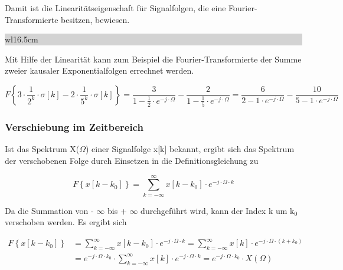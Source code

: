 \noindent Damit ist die Linearit\"{a}tseigenschaft f\"{u}r Signalfolgen, die eine Fourier-Transformierte besitzen, bewiesen.\bigskip

\noindent
\colorbox{lightgray}{%
%
\renewcommand\arraystretch{0.6}%
\begin{tabular}{ wl{16.5cm} }
{}
\end{tabular}%
}\medskip

\noindent Mit Hilfe der Linearit\"{a}t kann zum Beispiel die Fourier-Transformierte der Summe zweier kausaler Exponentialfolgen errechnet werden. 

\begin{equation}\label{eq:sevenfiftyfour}
F\left\{3\cdot \frac{1}{2^{k} } \cdot \sigma \left[k\right]-2\cdot \frac{1}{5^{k} } \cdot \sigma \left[k\right]\right\}=\frac{3}{1-\frac{1}{2} \cdot e^{-j\cdot \Omega } } -\frac{2}{1-\frac{1}{5} \cdot e^{-j\cdot \Omega } } =\frac{6}{2-1\cdot e^{-j\cdot \Omega } } -\frac{10}{5-1\cdot e^{-j\cdot \Omega }}
\end{equation}

\subsubsection{Verschiebung im Zeitbereich}

\noindent Ist das Spektrum X($\Omega$) einer Signalfolge x[k] bekannt, ergibt sich das Spektrum der verschobenen Folge durch Einsetzen in die Definitionsgleichung zu

\begin{equation}\label{eq:sevenfiftyfive}
F\left\{x\left[k-k_{0} \right]\right\}=\sum _{k=-\infty }^{\infty }x\left[k-k_{0} \right]\cdot e^{-j\cdot \Omega \cdot k}
\end{equation}

\noindent Da die Summation von - $\mathrm{\infty}$ bis + $\mathrm{\infty}$ durchgef\"{u}hrt wird, kann der Index k um k${}_{0}$ verschoben werden. Es ergibt sich

\begin{equation}\label{eq:sevenfiftysix}
\begin{split}
F\left\{x\left[k-k_{0} \right]\right\}&=\sum _{k=-\infty }^{\infty }x\left[k-k_{0} \right]\cdot e^{-j\cdot \Omega \cdot k}  =\sum _{k=-\infty }^{\infty }x\left[k\right]\cdot e^{-j\cdot \Omega \cdot \left(k+k_{0} \right)}\\ 
&=e^{-j\cdot \Omega \cdot k_{0} } \cdot \sum _{k=-\infty }^{\infty }x\left[k\right]\cdot e^{-j\cdot \Omega \cdot k}  =e^{-j\cdot \Omega \cdot k_{0} } \cdot X\left(\Omega \right)
\end{split}
\end{equation}

